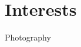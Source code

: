 \section{Interests}

\begin{cventries}
    \cventryii
        {Photography}
        {}
\end{cventries}
